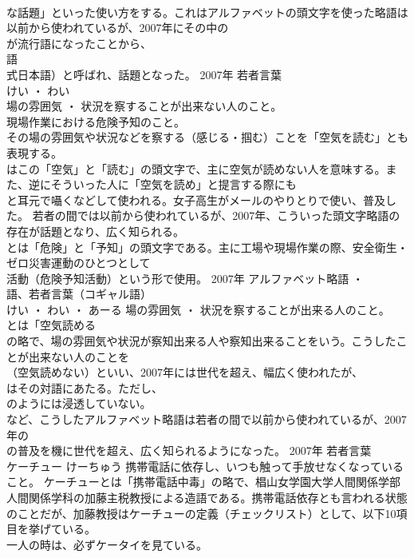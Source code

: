 \documentclass[8pt]{extreport}
\begin{document}
\begin{CJK}{UTF8}{min}
\\	な話題」といった使い方をする。これはアルファベットの頭文字を使った略語は以前から使われているが、2007年にその中の
\\	が流行語になったことから、
\\	語
\\	式日本語）と呼ばれ、話題となった。	2007年	若者言葉	
\\	けい ・ わい	
\\	場の雰囲気 ・ 状況を察することが出来ない人のこと。 
\\	現場作業における危険予知のこと。	
\\	その場の雰囲気や状況などを察する（感じる・掴む）ことを「空気を読む」とも表現する。
\\	はこの「空気」と「読む」の頭文字で、主に空気が読めない人を意味する。また、逆にそういった人に「空気を読め」と提言する際にも
\\	と耳元で囁くなどして使われる。女子高生がメールのやりとりで使い、普及した。 若者の間では以前から使われているが、2007年、こういった頭文字略語の存在が話題となり、広く知られる。 
\\	とは「危険」と「予知」の頭文字である。主に工場や現場作業の際、安全衛生・ゼロ災害運動のひとつとして
\\	活動（危険予知活動）という形で使用。	2007年	アルファベット略語 ・ 
\\	語、若者言葉（コギャル語）	
\\	けい ・ わい ・ あーる	場の雰囲気 ・ 状況を察することが出来る人のこと。	
\\	とは「空気読める
\\	の略で、場の雰囲気や状況が察知出来る人や察知出来ることをいう。こうしたことが出来ない人のことを
\\	（空気読めない）といい、2007年には世代を超え、幅広く使われたが、
\\	はその対語にあたる。ただし、
\\	のようには浸透していない。 
\\	など、こうしたアルファベット略語は若者の間で以前から使われているが、2007年の
\\	の普及を機に世代を超え、広く知られるようになった。	2007年	若者言葉	
\\	ケーチュー	けーちゅう	携帯電話に依存し、いつも触って手放せなくなっていること。	ケーチューとは「携帯電話中毒」の略で、椙山女学園大学人間関係学部人間関係学科の加藤主税教授による造語である。携帯電話依存とも言われる状態のことだが、加藤教授はケーチューの定義（チェックリスト）として、以下10項目を挙げている。 
\\	一人の時は、必ずケータイを見ている。 

\end{CJK}
\end{document}
